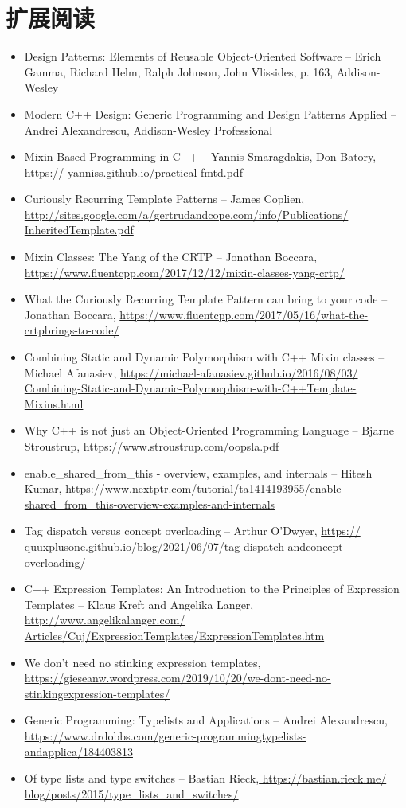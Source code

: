 \section{扩展阅读}
\begin{itemize}
  \item Design Patterns: Elements of Reusable Object-Oriented Software – Erich Gamma, Richard Helm, Ralph Johnson, John Vlissides, p. 163, Addison-Wesley
  \item Modern C++ Design: Generic Programming and Design Patterns Applied – Andrei Alexandrescu, Addison-Wesley Professional
  \item Mixin-Based Programming in C++ – Yannis Smaragdakis, Don Batory, \url{https:// yanniss.github.io/practical-fmtd.pdf}
  \item Curiously Recurring Template Patterns – James Coplien, \url{http://sites.google.com/a/gertrudandcope.com/info/Publications/ InheritedTemplate.pdf}
  \item Mixin Classes: The Yang of the CRTP – Jonathan Boccara, \url{https://www.fluentcpp.com/2017/12/12/mixin-classes-yang-crtp/}
  \item What the Curiously Recurring Template Pattern can bring to your code – Jonathan Boccara, \url{https://www.fluentcpp.com/2017/05/16/what-the-crtpbrings-to-code/}
  \item Combining Static and Dynamic Polymorphism with C++ Mixin classes – Michael Afanasiev, \url{https://michael-afanasiev.github.io/2016/08/03/ Combining-Static-and-Dynamic-Polymorphism-with-C++Template-Mixins.html}
  \item Why C++ is not just an Object-Oriented Programming Language – Bjarne Stroustrup, https://www.stroustrup.com/oopsla.pdf
  \item enable_shared_from_this - overview, examples, and internals – Hitesh Kumar, \url{https://www.nextptr.com/tutorial/ta1414193955/enable_ shared_from_this-overview-examples-and-internals}
  \item Tag dispatch versus concept overloading – Arthur O’Dwyer, \url{https:// quuxplusone.github.io/blog/2021/06/07/tag-dispatch-andconcept-overloading/}
  \item C++ Expression Templates: An Introduction to the Principles of Expression Templates – Klaus Kreft and Angelika Langer, \url{http://www.angelikalanger.com/ Articles/Cuj/ExpressionTemplates/ExpressionTemplates.htm}
  \item We don’t need no stinking expression templates, \url{https://gieseanw.wordpress.com/2019/10/20/we-dont-need-no-stinkingexpression-templates/}
  \item Generic Programming: Typelists and Applications – Andrei Alexandrescu, \url{https://www.drdobbs.com/generic-programmingtypelists-andapplica/184403813}
  \item Of type lists and type switches – Bastian Rieck,\url{ https://bastian.rieck.me/ blog/posts/2015/type_lists_and_switches/}
\end{itemize}